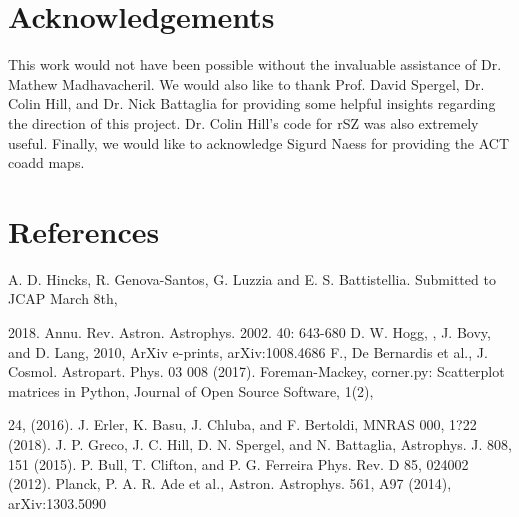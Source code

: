 \documentclass{princeton_astro_thesis}
\begin{document}
\chapter{Acknowledgements}
This work would not have been possible without the invaluable assistance of Dr. Mathew Madhavacheril. We would also like to thank Prof. David Spergel,  Dr. Colin Hill, and Dr. Nick Battaglia for providing some helpful insights regarding the direction of this project.   Dr. Colin Hill's code for rSZ was also extremely useful. Finally, we would like to acknowledge Sigurd Naess for providing the ACT coadd maps.

\chapter{References}
A. D. Hincks, R. Genova-Santos, G. Luzzia and E. S. Battistellia. Submitted to JCAP March 8th, \par 2018. \newline
Annu. Rev. Astron. Astrophys. 2002. 40: 643-680\newline
D. W. Hogg, , J. Bovy,  and D. Lang,  2010, ArXiv e-prints, arXiv:1008.4686 \newline
F., De Bernardis et al., J. Cosmol. Astropart. Phys. 03 008 (2017). \newline
Foreman-Mackey, corner.py: Scatterplot matrices in Python, Journal of Open Source Software, 1(2), \par 24, (2016).\newline
J. Erler, K. Basu, J. Chluba, and F. Bertoldi, MNRAS 000, 1?22 (2018).
J. P. Greco, J. C. Hill, D. N. Spergel, and N. Battaglia,
Astrophys. J. 808, 151 (2015). \newline
P. Bull, T. Clifton, and P. G. Ferreira Phys. Rev. D 85, 024002 (2012). \newline
Planck, P. A. R. Ade et al., Astron. Astrophys. 561, A97 (2014), arXiv:1303.5090
\end{document}
